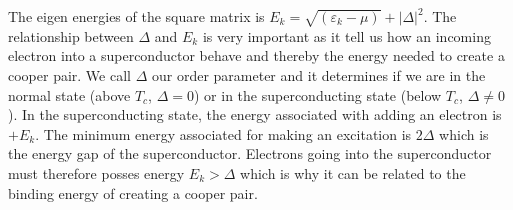         The eigen energies of the square matrix is $E_k = \sqrt{(\varepsilon_k-\mu)} + |\Delta|^2$. The relationship between $\Delta$ and $E_k$ is very important as it tell us how an incoming electron into a superconductor behave and thereby the energy needed to create a cooper pair. We call $\Delta$ our order parameter and it determines if we are in the normal state (above $T_c$, $\Delta = 0$) or in the superconducting state (below $T_c$, $\Delta \neq 0$). In the superconducting state, the energy associated with adding an electron is $+E_k$. The minimum energy associated for making an excitation is $2\Delta$ which is the energy gap of the superconductor. Electrons going into the superconductor must therefore posses energy $E_k > \Delta$  which is why it can be related to the binding energy of creating a cooper pair.
        

